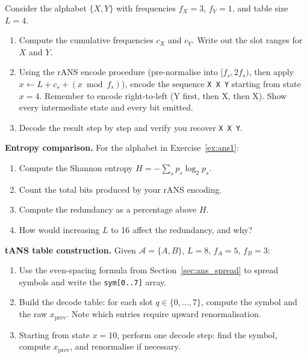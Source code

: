 \begin{exercisebox}
\label{ex:ans1}
Consider the alphabet $\{X, Y\}$ with frequencies $f_X = 3$,
$f_Y = 1$, and table size $L = 4$.
\begin{enumerate}[label=(\alph*)]
  \item Compute the cumulative frequencies $c_X$ and $c_Y$.
        Write out the slot ranges for $X$ and $Y$.
  \item Using the rANS encode procedure (pre-normalise into
        $[f_s, 2f_s)$, then apply $x \leftarrow L + c_s +
        (x \bmod f_s)$), encode the sequence \texttt{X X Y}
        starting from state $x = 4$.  Remember to encode
        right-to-left (Y first, then X, then X).  Show every
        intermediate state and every bit emitted.
  \item Decode the result step by step and verify you recover
        \texttt{X X Y}.
\end{enumerate}
\end{exercisebox}

\begin{exercisebox}
\textbf{Entropy comparison.}  For the alphabet in
Exercise~\ref{ex:ans1}:
\begin{enumerate}[label=(\alph*)]
  \item Compute the Shannon entropy $H = -\sum_s p_s \log_2 p_s$.
  \item Count the total bits produced by your rANS encoding.
  \item Compute the redundancy as a percentage above $H$.
  \item How would increasing $L$ to 16 affect the redundancy,
        and why?
\end{enumerate}
\end{exercisebox}

\begin{exercisebox}
\textbf{tANS table construction.}
Given $\mathcal{A} = \{A, B\}$, $L = 8$, $f_A = 5$,
$f_B = 3$:
\begin{enumerate}[label=(\alph*)]
  \item Use the even-spacing formula from
        Section~\ref{sec:ans_spread} to spread symbols and
        write the \texttt{sym[0..7]} array.
  \item Build the decode table: for each slot
        $q \in \{0,\ldots,7\}$, compute the symbol and the
        raw $x_{\text{prev}}$.  Note which entries require
        upward renormalisation.
  \item Starting from state $x = 10$, perform one decode step:
        find the symbol, compute $x_{\text{prev}}$, and
        renormalise if necessary.
\end{enumerate}
\end{exercisebox}

